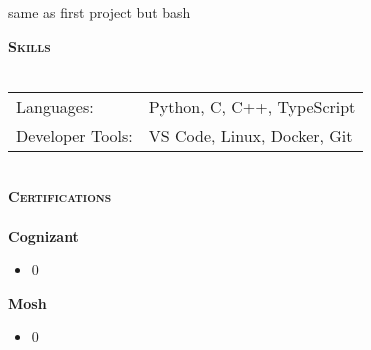 \documentclass[a4paper]{article}
\newcommand{\lineunder} {
    \vspace*{-8pt} \\
    \hspace*{-18pt} \hrulefill \\
}
\newcommand{\header} [1] {
    {\hspace*{-18pt}\vspace*{6pt} \textsc{#1}}
    \vspace*{-6pt} \lineunder
}
\begin{document}
\begin{itemize} \itemsep 0pt 
\textbullet same as first project but bash 
\end{itemize} 
\header{\textbf{Skills}} 
\begin{tabular}{l l} 
Languages: & Python, C, C++, TypeScript \\ 
Developer Tools: & VS Code, Linux, Docker, Git \\ 
\end{tabular} \\ 
\header{\textbf{Certifications}} 
\textbf{Cognizant} 
\begin{itemize} \itemsep 0pt 
\item{0} 

 \end{itemize} 
\textbf{Mosh} 
\begin{itemize} \itemsep 0pt 
\item{0} 

 \end{itemize} 
\end{document}
